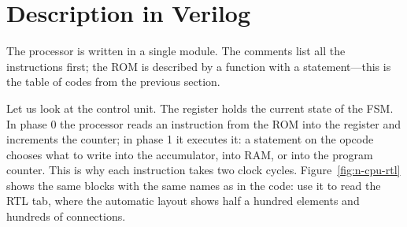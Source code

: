 \section{Description in Verilog}

The processor is written in a single module. The comments list all the
instructions first; the ROM is described by a function with a 
statement---this is the table of codes from the previous section.


Let us look at the control unit. The  register holds the current
state of the FSM. In phase 0 the processor reads an instruction from the ROM into
the  register and increments the  counter; in phase 1 it
executes it: a  statement on the opcode chooses what to write into the
accumulator, into RAM, or into the program counter. This is why each instruction
takes two clock cycles. Figure~\ref{fig:n-cpu-rtl} shows the same blocks with the
same names as in the code: use it to read the RTL tab, where the automatic layout
shows half a hundred elements and hundreds of connections.

